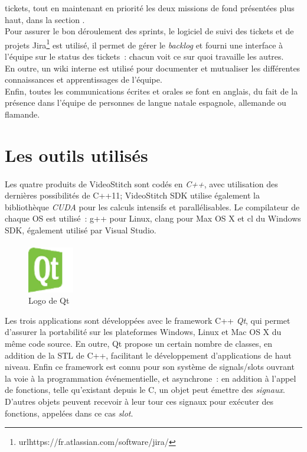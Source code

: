 tickets, tout en maintenant en priorité les deux missions de fond présentées plus haut, dans 
la section .\\
\newline
Pour assurer le bon déroulement des sprints, le logiciel de suivi des tickets et 
de projets Jira\footnote{url{https://fr.atlassian.com/software/jira/}} est utilisé,
il permet de gérer le \textit{backlog} et fourni une interface à l'équipe sur le status des
tickets~: chacun voit ce sur quoi travaille les autres.\\
En outre, un wiki interne est utilisé pour documenter et mutualiser les différentes
connaissances et apprentissages de l'équipe.\\
Enfin, toutes les communications écrites et orales se font en anglais, du fait
de la présence dans l'équipe de personnes de langue natale espagnole, allemande ou flamande.

\section{Les outils utilisés}
\label{outils-utilisés}
\paragraph{}
Les quatre produits de VideoStitch sont codés en \emph{C++}, avec utilisation des dernières possibilités
de C++11; VideoStitch SDK utilise également la bibliothèque \emph{CUDA} pour les calculs intensifs et parallélisables.
Le compilateur de chaque OS est utilisé~: g++ pour Linux, clang pour Max OS X et 
cl du Windows SDK, également utilisé par Visual Studio.
\paragraph{}
\begin{figure}
  \centering
  \includegraphics[width=2cm]{images/qt-logo.png}
  \caption{Logo de Qt}
\end{figure}
Les trois applications sont  
développées avec le framework C++ \emph{Qt}, qui permet d'assurer la portabilité sur les 
plateformes Windows, Linux et Mac OS X du même code source. En outre, Qt
propose un certain nombre de classes, en addition de la STL de C++, facilitant le
développement d'applications de haut niveau. Enfin ce framework est connu pour son
système de signals/slots ouvrant la voie à la programmation événementielle, et
asynchrone~: en addition à l'appel de fonctions, telle qu'existant depuis le C,
un objet peut émettre des \textit{signaux}. D'autres objets peuvent recevoir à leur tour
ces signaux pour exécuter des fonctions, appelées dans ce cas \textit{slot}.\cite{qt}
